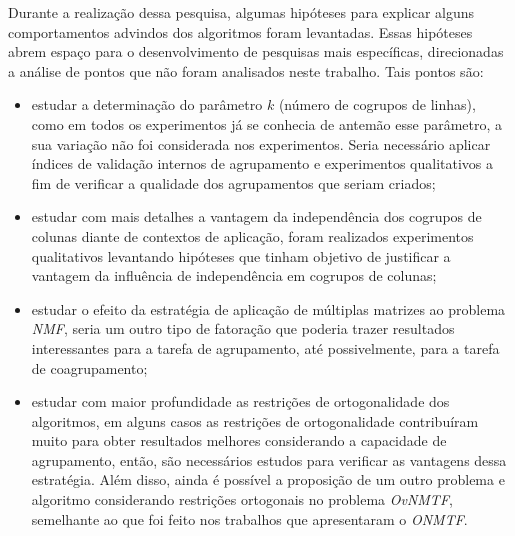 \documentclass[
    12pt,                %
    oneside,            %
    a4paper,            %
    english,            %
    brazil                %
    ]{abntex2ppgsi}
\begin{document}
Durante a realização dessa pesquisa, algumas hipóteses para explicar alguns comportamentos advindos dos algoritmos foram levantadas.
Essas hipóteses abrem espaço para o desenvolvimento de pesquisas mais específicas, direcionadas a análise de pontos que não foram analisados neste trabalho. Tais pontos são:
\begin{itemize}
    \item estudar a determinação do parâmetro $k$ (número de cogrupos de linhas), como em todos os experimentos já se conhecia de antemão esse parâmetro, a sua variação não foi considerada nos experimentos. Seria necessário aplicar índices de validação internos de agrupamento e experimentos qualitativos a fim de verificar a qualidade dos agrupamentos que seriam criados;
    \item estudar com mais detalhes a vantagem da independência dos cogrupos de colunas diante de contextos de aplicação, foram realizados experimentos qualitativos levantando hipóteses que tinham objetivo de justificar a vantagem da influência de independência em cogrupos de colunas;
    \item estudar o efeito da estratégia de aplicação de múltiplas matrizes ao problema \textit{NMF}, seria um outro tipo de fatoração que poderia trazer resultados interessantes para a tarefa de agrupamento, até possivelmente, para a tarefa de coagrupamento;
    \item estudar com maior profundidade as restrições de ortogonalidade dos algoritmos, em alguns casos as restrições de ortogonalidade contribuíram muito para obter resultados melhores considerando a capacidade de agrupamento, então, são necessários estudos para verificar as vantagens dessa estratégia. Além disso, ainda é possível a proposição de um outro problema e algoritmo considerando restrições ortogonais no problema \textit{OvNMTF}, semelhante ao que foi feito nos trabalhos que apresentaram o \textit{ONMTF}.
\end{itemize}




\end{document}

